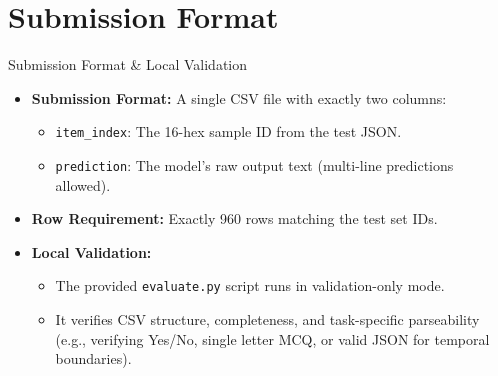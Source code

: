 \documentclass[aspectratio=169]{beamer}
\begin{document}
\section{Submission Format}
\begin{frame}{Submission Format \& Local Validation}
    \begin{itemize}
        \item \textbf{Submission Format:} A single CSV file with exactly two columns:
        \begin{itemize}
            \item \texttt{item\_index}: The 16-hex sample ID from the test JSON.
            \item \texttt{prediction}: The model's raw output text (multi-line predictions allowed).
        \end{itemize}
        \item \textbf{Row Requirement:} Exactly 960 rows matching the test set IDs.
        \item \textbf{Local Validation:}
        \begin{itemize}
            \item The provided \texttt{evaluate.py} script runs in validation-only mode.
            \item It verifies CSV structure, completeness, and task-specific parseability (e.g., verifying Yes/No, single letter MCQ, or valid JSON for temporal boundaries).
        \end{itemize}
    \end{itemize}
\end{frame}
\end{document}
